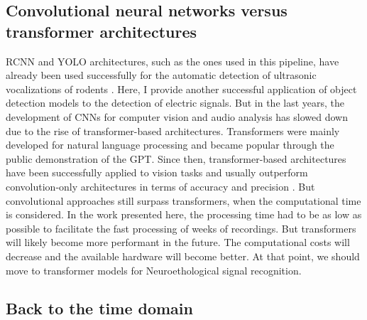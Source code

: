 \subsection{Convolutional neural networks versus transformer architectures}

RCNN and YOLO architectures, such as the ones used in this pipeline, have
already been used successfully for the automatic detection of ultrasonic
vocalizations of rodents \parencite{coffeyDeepSqueakDeepLearningbased2019}.
Here, I provide another successful application of object detection models to
the detection of electric signals. But in the last years, the development of
CNNs for computer vision and audio analysis has slowed down due to the rise of
transformer-based architectures. Transformers were mainly developed for natural
language processing and became popular through the public demonstration of the
\acrfull{GPT}. Since then, transformer-based architectures have been
successfully applied to vision tasks and usually outperform convolution-only
architectures in terms of accuracy and precision
\parencite{shehzadiObjectDetectionTransformers2023}. But convolutional
approaches still surpass transformers, when the computational time is
considered. In the work presented here, the processing time had to be as low as
possible to facilitate the fast processing of weeks of recordings. But
transformers will likely become more performant in the future. The
computational costs will decrease and the available hardware will become
better. At that point, we should move to transformer models for
Neuroethological signal recognition.

\subsection{Back to the time domain}

